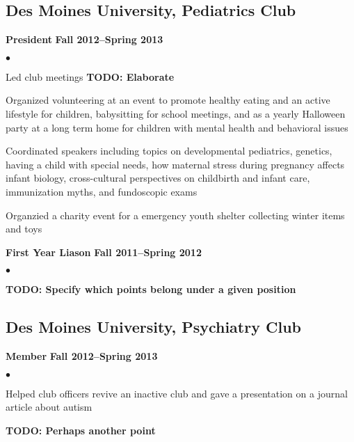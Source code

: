 \documentclass[10pt,letterpaper]{article}
\renewenvironment{itemize}{
  \begin{list}{}{
      \setlength{\leftmargin}{1.5em}
      \setlength{\itemsep}{0.25em}
      \setlength{\parskip}{0pt}
      \setlength{\parsep}{0.25em}
    }
  }{
  \end{list}
}
\newenvironment{bitemize}{
  \begin{list}{$\bullet$}{
      \setlength{\leftmargin}{1.5em}
      \setlength{\itemsep}{0.25em}
      \setlength{\parskip}{0pt}
      \setlength{\parsep}{0.25em}
    }
  }{
  \end{list}
}
\begin{document}
\subsection*{Des Moines University, Pediatrics Club}
\begin{itemize}
\item \textbf{President} \hfill \textbf{Fall 2012--Spring 2013}
  \begin{bitemize}
  \item Led club meetings \textbf{TODO: Elaborate}
  \item Organized volunteering at an event to promote healthy eating
    and an active lifestyle for children, babysitting for school
    meetings, and as a yearly Halloween party at a long term home for
    children with mental health and behavioral issues
  \item Coordinated speakers including topics on developmental
    pediatrics, genetics, having a child with special needs, how
    maternal stress during pregnancy affects infant biology,
    cross-cultural perspectives on childbirth and infant care,
    immunization myths, and fundoscopic exams
  \item Organzied a charity event for a emergency youth shelter
    collecting winter items and toys
  \end{bitemize}
\item \textbf{First Year Liason} \hfill \textbf{Fall 2011--Spring 2012}
  \begin{bitemize}
  \item \textbf{TODO: Specify which points belong under a given position}
  \end{bitemize}
\end{itemize}

\subsection*{Des Moines University, Psychiatry Club}
\begin{itemize}
\item \textbf{Member} \hfill \textbf{Fall 2012--Spring 2013}
  \begin{bitemize}
  \item Helped club officers revive an inactive club and gave a
    presentation on a journal article about autism
  \item \textbf{TODO: Perhaps another point}
  \end{bitemize}
\end{itemize}
\end{document}
